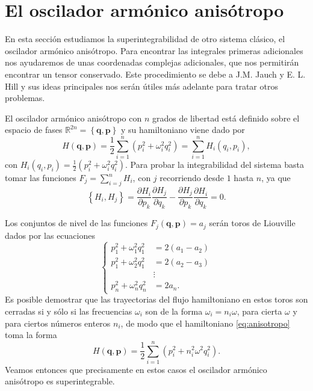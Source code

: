 \documentclass[12pt,a4paper,twoside]{article}
\theoremstyle{definition} \newtheorem{defn}[thm]{Definición}
\theoremstyle{definition} \newtheorem{ejemplo}[thm]{Ejemplo}
\theoremstyle{definition} \newtheorem{ejercicio}[thm]{Ejercicio}
\theoremstyle{remark} \newtheorem*{obs}{Observación}
\def\RR{\mathbb{R}}
\newcommand{\vect}[1]{\mathbf{#1}}
\newcommand{\parcial}[2]{\frac{\partial #1}{\partial #2}}
\begin{document}
\section{El oscilador armónico anisótropo}
En esta sección estudiamos la superintegrabilidad de otro sistema clásico, el oscilador armónico anisótropo. Para encontrar las integrales primeras adicionales nos ayudaremos de unas coordenadas complejas adicionales, que nos permitirán encontrar un tensor conservado. Este procedimiento se debe a J.M. Jauch y E. L. Hill \cite{jauchhill} y sus ideas principales nos serán útiles más adelante para tratar otros problemas.

El oscilador armónico anisótropo con $n$ grados de libertad está definido sobre el espacio de fases $\RR^{2n}=\left\{ \vect{q},\vect{p} \right\}$ y su hamiltoniano viene dado por
\begin{equation}
  H(\vect{q},\vect{p})=\frac{1}{2}\sum_{i=1}^n \left(p_i^2 + \omega_i^2q_i^2\right)=\sum_{i=1}^n H_i(q_i,p_i),
  \label{eq:anisotropo}
\end{equation}
con $H_i(q_i,p_i)=\frac{1}{2}(p_i^2+\omega_i^2q_i^2)$. Para probar la integrabilidad del sistema basta tomar las funciones $F_j=\sum_{i=j}^n H_i$, con $j$ recorriendo desde $1$ hasta $n$, ya que
\begin{equation*}
  \left\{ H_i,H_j \right\}=\parcial{H_i}{p_k}\parcial{H_j}{q_k}-\parcial{H_j}{p_k}\parcial{H_i}{q_k}=0.
\end{equation*}

Los conjuntos de nivel de las funciones $F_j(\vect{q},\vect{p})=a_j$ serán toros de Liouville dados por las ecuaciones
\begin{equation*}
  \begin{cases}
    p_1^2+\omega_1^2q_1^2&= 2(a_1-a_2)\\
    p_1^2+\omega_2^2q_1^2&= 2(a_2-a_3)\\
     &\vdots \\
    p_n^2+\omega_n^2q_n^2&= 2a_n.
  \end{cases}
\end{equation*}
Es posible demostrar que las trayectorias del flujo hamiltoniano en estos toros son cerradas si y sólo si las frecuencias $\omega_i$ son de la forma $\omega_i=n_i \omega$, para cierta $\omega$ y para ciertos números enteros $n_i$, de modo que el hamiltoniano \eqref{eq:anisotropo} toma la forma
\begin{equation}
  H(\vect{q},\vect{p})=\frac{1}{2}\sum_{i=1}^n \left(p_i^2 + n_i^2\omega^2q_i^2\right).
\end{equation}
Veamos entonces que precisamente en estos casos el oscilador armónico anisótropo es superintegrable.
\end{document}
